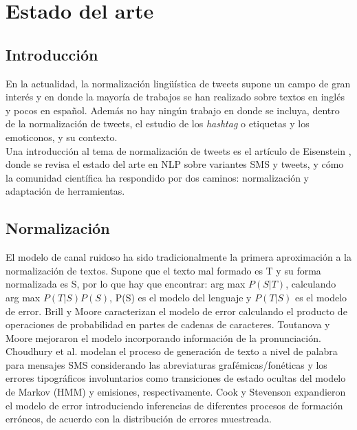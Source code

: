 \documentclass[spanish,12pt, a4paper,twoside]{paper}
\let\oldsection\section
\def\section{\cleardoublepage\oldsection}
\begin{document}
\section{Estado del arte}\label{sec:estadodelarte}
\subsection{Introducción}\label{sec:introduccion}
En la actualidad, la normalización lingüística de tweets \cite{baldwin:2011} supone un campo de gran interés y en donde la mayoría de trabajos se han realizado sobre textos en inglés y pocos en español. Además no hay ningún trabajo en donde se incluya, dentro de la normalización de tweets, el estudio de los \textit{hashtag} o etiquetas y los emoticonos, y su contexto. \\
Una introducción al tema de normalización de tweets es el artículo de Eisenstein \cite{eisenstein:2013}, donde se revisa el estado del arte en NLP sobre variantes SMS y tweets, y cómo la comunidad científica ha respondido por dos caminos: normalización y adaptación de herramientas.
\subsection{Normalización}\label{sec:normalizacion}
El modelo de canal ruidoso \cite{shannon:1948} ha sido tradicionalmente la primera aproximación a la normalización de textos. Supone que el texto mal formado es T y su forma normalizada es S, por lo que hay que encontrar: arg max $P(S|T)$, calculando arg max $P(T|S) P(S)$, P(S) es el modelo del lenguaje y $P(T|S)$ es el modelo de error. Brill y Moore \cite{brillmoore:2000} caracterizan el modelo de error calculando el producto de operaciones de probabilidad en partes de cadenas de caracteres. Toutanova y Moore \cite{toutanovamoore:2002} mejoraron el modelo incorporando información de la pronunciación. Choudhury et al. \cite{choudhury:2007} modelan el proceso de generación de texto a nivel de palabra para mensajes SMS considerando las abreviaturas grafémicas/fonéticas y los errores tipográficos involuntarios como transiciones de estado ocultas del modelo de Markov (HMM) y emisiones, respectivamente. Cook y Stevenson \cite{cookstevenson:2009} expandieron el modelo de error introduciendo inferencias de diferentes procesos de formación erróneos, de acuerdo con la distribución de errores muestreada.\\
\end{document}

